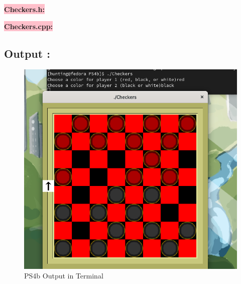 \textbf{\colorbox{pink}{Checkers.h:}} 


\newpage
\textbf{\colorbox{pink}{Checkers.cpp: }} 


\subsection{Output :}
\begin{figure}[h]
   \centering
    \includegraphics[width=1\textwidth]{projectPictures/ps4b.png}
    \caption{PS4b Output in Terminal}
    \label{fig:ps4b}
\end{figure}


\newpage
